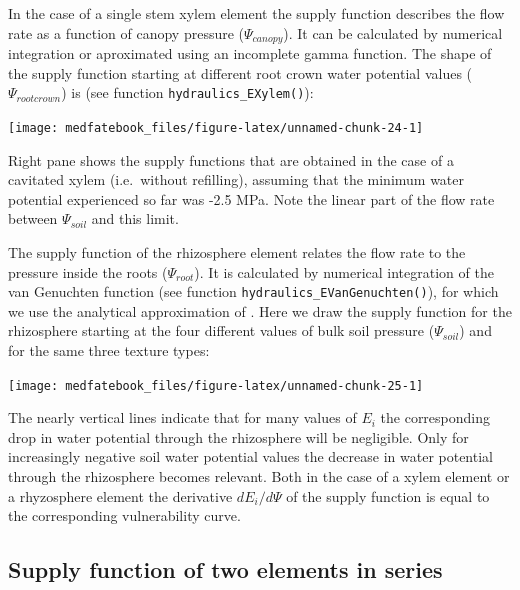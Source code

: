 \documentclass[]{book}
\begin{document}
In the case of a single stem xylem element the supply function describes the flow rate as a function of canopy pressure (\(\Psi_{canopy}\)). It can be calculated by numerical integration or aproximated using an incomplete gamma function. The shape of the supply function starting at different root crown water potential values (\(\Psi_{rootcrown}\)) is (see function \texttt{hydraulics\_EXylem()}):

\begin{center}\texttt{[image: medfatebook\_files/figure-latex/unnamed-chunk-24-1]} \end{center}

Right pane shows the supply functions that are obtained in the case of a cavitated xylem (i.e.~without refilling), assuming that the minimum water potential experienced so far was -2.5 MPa. Note the linear part of the flow rate between \(\Psi_{soil}\) and this limit.

The supply function of the rhizosphere element relates the flow rate to the pressure inside the roots (\(\Psi_{root}\)). It is calculated by numerical integration of the van Genuchten function (see function \texttt{hydraulics\_EVanGenuchten()}), for which we use the analytical approximation of \citet{VanLier2009}. Here we draw the supply function for the rhizosphere starting at the four different values of bulk soil pressure (\(\Psi_{soil}\)) and for the same three texture types:

\begin{center}\texttt{[image: medfatebook\_files/figure-latex/unnamed-chunk-25-1]} \end{center}

The nearly vertical lines indicate that for many values of \(E_i\) the corresponding drop in water potential through the rhizosphere will be negligible. Only for increasingly negative soil water potential values the decrease in water potential through the rhizosphere becomes relevant. Both in the case of a xylem element or a rhyzosphere element the derivative \(dE_i/d\Psi\) of the supply function is equal to the corresponding vulnerability curve.

\hypertarget{supply-function-of-two-elements-in-series}{%
\subsection{Supply function of two elements in series}\label{supply-function-of-two-elements-in-series}}
\end{document}
